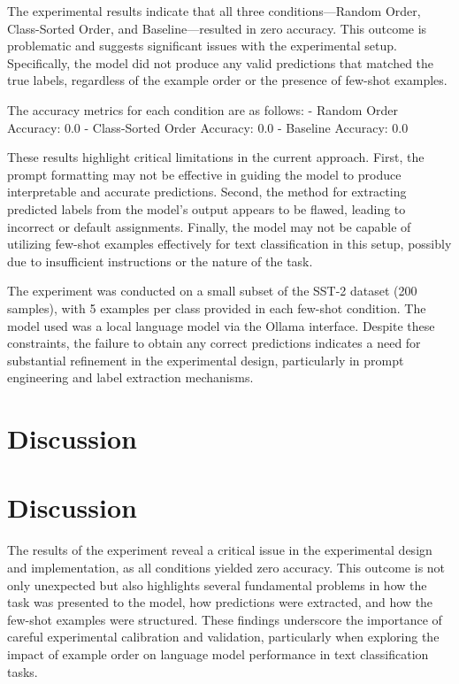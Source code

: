 \documentclass{article}
\begin{document}
The experimental results indicate that all three conditions—Random Order, Class-Sorted Order, and Baseline—resulted in zero accuracy. This outcome is problematic and suggests significant issues with the experimental setup. Specifically, the model did not produce any valid predictions that matched the true labels, regardless of the example order or the presence of few-shot examples. 

The accuracy metrics for each condition are as follows:
- Random Order Accuracy: 0.0
- Class-Sorted Order Accuracy: 0.0
- Baseline Accuracy: 0.0

These results highlight critical limitations in the current approach. First, the prompt formatting may not be effective in guiding the model to produce interpretable and accurate predictions. Second, the method for extracting predicted labels from the model's output appears to be flawed, leading to incorrect or default assignments. Finally, the model may not be capable of utilizing few-shot examples effectively for text classification in this setup, possibly due to insufficient instructions or the nature of the task.

The experiment was conducted on a small subset of the SST-2 dataset (200 samples), with 5 examples per class provided in each few-shot condition. The model used was a local language model via the Ollama interface. Despite these constraints, the failure to obtain any correct predictions indicates a need for substantial refinement in the experimental design, particularly in prompt engineering and label extraction mechanisms.
\section{Discussion}
\section*{Discussion}

The results of the experiment reveal a critical issue in the experimental design and implementation, as all conditions yielded zero accuracy. This outcome is not only unexpected but also highlights several fundamental problems in how the task was presented to the model, how predictions were extracted, and how the few-shot examples were structured. These findings underscore the importance of careful experimental calibration and validation, particularly when exploring the impact of example order on language model performance in text classification tasks.
\end{document}
